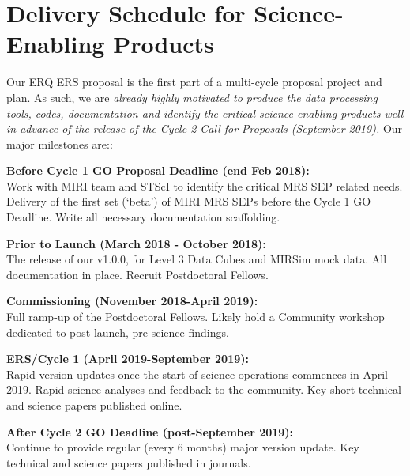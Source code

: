 \section*{Delivery Schedule for Science-Enabling Products} 
\vspace{-6pt}
Our ERQ ERS proposal is the first part of a multi-cycle proposal
project and plan.  As such, we are {\it already highly motivated to
produce the data processing tools, codes, documentation and identify
the critical science-enabling products well in advance of the release
of the Cycle 2 Call for Proposals (September 2019).}
Our major milestones are::

\smallskip
\smallskip
\noindent
{\bf Before Cycle 1 GO Proposal Deadline (end Feb 2018):}\\ 
Work with MIRI team and STScI to identify the critical MRS SEP related needs. 
Delivery of the first set (‘beta’) of MIRI MRS SEPs before the Cycle 1 GO Deadline. 
Write all necessary documentation scaffolding. 

\smallskip
\smallskip
\noindent
 {\bf Prior to Launch (March 2018 - October 2018):}\\ 
The release of our v1.0.0, for Level 3 Data Cubes and MIRSim mock data. 
All documentation in place. Recruit Postdoctoral Fellows. 

\smallskip
\smallskip
\noindent
{\bf Commissioning (November 2018-April 2019):}\\ 
Full ramp-up of the Postdoctoral Fellows. 
Likely hold a Community workshop dedicated to post-launch, 
pre-science findings. 

\smallskip
\smallskip
\noindent
{\bf ERS/Cycle 1 (April 2019-September 2019):}\\ 
Rapid version updates once the start of science operations commences in April 2019.  
Rapid science analyses and feedback to the community. 
Key short technical and science papers published online. 

\smallskip
\smallskip
\noindent
{\bf After Cycle 2 GO Deadline (post-September 2019):}\\ 
Continue to provide regular (every 6 months) major version update.
Key technical and science papers published in journals. 



%



